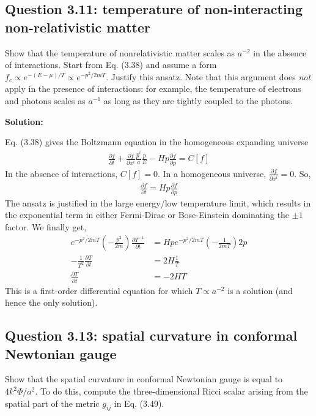 \documentclass[11pt]{article}
\begin{document}
\subsection{Question 3.11: temperature of non-interacting non-relativistic matter}
Show that the temperature of nonrelativistic matter scales as $a^{-2}$ in the absence of interactions. Start from Eq. (3.38) and assume a form $f_c \propto e^{-(E - \mu)/T } \propto e^{-p^2/2mT}$. Justify this ansatz. Note that this argument does \textit{not} apply in the presence of interactions: for example, the temperature of electrons and photons scales as $a^{-1}$ as long as they are tightly coupled to the photons. 

\textbf{Solution:}

Eq. (3.38) gives the Boltzmann equation in the homogeneous expanding universe 
\begin{align*}
    \frac{\partial f}{\partial t} + \frac{\partial f}{\partial x^i}\frac{\hat{p}^i}{a}\frac{p}{E} -Hp \frac{\partial f}{\partial p} = C[f]
\end{align*}
In the absence of interactions, $C[f] = 0$. In a homogeneous universe, $\frac{\partial f}{\partial x^i} = 0$. So, 
\begin{align*}
    \frac{\partial f}{\partial t} = Hp \frac{\partial f}{\partial p} 
\end{align*}
The ansatz is justified in the large energy/low temperature limit, which results in the exponential term in either Fermi-Dirac or Bose-Einstein dominating the $\pm 1$ factor. We finally get, 
\begin{align*}
    e^{-p^2/2mT} \left(-\frac{p^2}{2m}\right) \frac{\partial T^{-1}}{\partial t} &= Hp e^{-p^2/2mT} \left(-\frac{1}{2mT}\right) 2p \\
    -\frac{1}{T^2} \frac{\partial T}{\partial t} &= 2H\frac{1}{T} \\
    \frac{\partial T}{\partial t} &= -2HT
\end{align*}
This is a first-order differential equation for which $T \propto a^{-2}$ is a solution (and hence the only solution). 

\subsection{Question 3.13: spatial curvature in conformal Newtonian gauge}
Show that the spatial curvature in conformal Newtonian gauge is equal to $4k^2\Phi/a^2$. To do this, compute the three-dimensional Ricci scalar arising from the spatial part of the metric $g_{ij}$ in Eq. (3.49).
\end{document}
